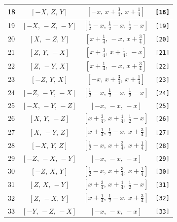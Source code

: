 \documentclass[fleqn,8pt]{jsarticle}
\begin{document}
\begin{longtable}{cccc}
18 & $\left[ - X,\, Z,\, Y \right]$ & $\left[ - x,\, x + \frac{3}{4},\, x + \frac{1}{4} \right]$ & {\tt [18]} \\ \hline
19 & $\left[ - X,\, - Z,\, - Y \right]$ & $\left[ \frac{1}{2} - x,\, \frac{1}{2} - x,\, \frac{1}{2} - x \right]$ & {\tt [19]} \\ \hline
20 & $\left[ X,\, - Z,\, Y \right]$ & $\left[ x + \frac{1}{4},\, - x,\, x + \frac{3}{4} \right]$ & {\tt [20]} \\ \hline
21 & $\left[ Z,\, Y,\, - X \right]$ & $\left[ x + \frac{3}{4},\, x + \frac{1}{4},\, - x \right]$ & {\tt [21]} \\ \hline
22 & $\left[ Z,\, - Y,\, X \right]$ & $\left[ x + \frac{1}{4},\, - x,\, x + \frac{3}{4} \right]$ & {\tt [22]} \\ \hline
23 & $\left[ - Z,\, Y,\, X \right]$ & $\left[ - x,\, x + \frac{3}{4},\, x + \frac{1}{4} \right]$ & {\tt [23]} \\ \hline
24 & $\left[ - Z,\, - Y,\, - X \right]$ & $\left[ \frac{1}{2} - x,\, \frac{1}{2} - x,\, \frac{1}{2} - x \right]$ & {\tt [24]} \\ \hline
25 & $\left[ - X,\, - Y,\, - Z \right]$ & $\left[ - x,\, - x,\, - x \right]$ & {\tt [25]} \\ \hline
26 & $\left[ X,\, Y,\, - Z \right]$ & $\left[ x + \frac{3}{4},\, x + \frac{1}{4},\, \frac{1}{2} - x \right]$ & {\tt [26]} \\ \hline
27 & $\left[ X,\, - Y,\, Z \right]$ & $\left[ x + \frac{1}{4},\, \frac{1}{2} - x,\, x + \frac{3}{4} \right]$ & {\tt [27]} \\ \hline
28 & $\left[ - X,\, Y,\, Z \right]$ & $\left[ \frac{1}{2} - x,\, x + \frac{3}{4},\, x + \frac{1}{4} \right]$ & {\tt [28]} \\ \hline
29 & $\left[ - Z,\, - X,\, - Y \right]$ & $\left[ - x,\, - x,\, - x \right]$ & {\tt [29]} \\ \hline
30 & $\left[ - Z,\, X,\, Y \right]$ & $\left[ \frac{1}{2} - x,\, x + \frac{3}{4},\, x + \frac{1}{4} \right]$ & {\tt [30]} \\ \hline
31 & $\left[ Z,\, X,\, - Y \right]$ & $\left[ x + \frac{3}{4},\, x + \frac{1}{4},\, \frac{1}{2} - x \right]$ & {\tt [31]} \\ \hline
32 & $\left[ Z,\, - X,\, Y \right]$ & $\left[ x + \frac{1}{4},\, \frac{1}{2} - x,\, x + \frac{3}{4} \right]$ & {\tt [32]} \\ \hline
33 & $\left[ - Y,\, - Z,\, - X \right]$ & $\left[ - x,\, - x,\, - x \right]$ & {\tt [33]} \\ \hline

\end{longtable}
\end{document}
